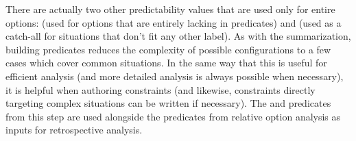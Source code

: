\begin{enumerate}
There are actually two other predictability values that are used only for entire options:  (used for options that are entirely lacking in  predicates) and  (used as a catch-all for situations that don't fit any other label).
%
As with the  summarization, building  predicates reduces the complexity of possible  configurations to a few cases which cover common situations.
%
In the same way that this is useful for efficient analysis (and more detailed analysis is always possible when necessary), it is helpful when authoring constraints (and likewise, constraints directly targeting complex  situations can be written if necessary).
%
The  and  predicates from this step are used alongside the  predicates from relative option analysis as inputs for retrospective analysis.



\end{enumerate}

